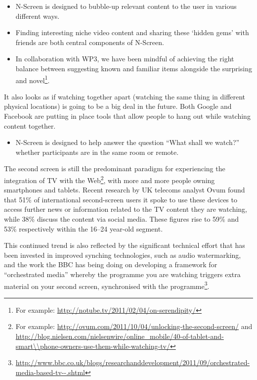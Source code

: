 \documentclass{notube}
\begin{document}
\begin{itemize}
\item{N-Screen is designed to bubble-up relevant content to the user in various different ways.}
\item{Finding interesting niche video content and sharing these `hidden gems’ with friends are both central components of N-Screen.}
\item{In collaboration with WP3, we have been mindful of achieving the right balance between suggesting known and familiar items alongside the surprising and novel\footnote{For example: \url{http://notube.tv/2011/02/04/on-serendipity/}}.}
\end{itemize}

It also looks as if watching together apart (watching the same thing in different physical locations) is going to be a big deal in the future. Both Google and Facebook are putting in place tools that allow people to hang out while watching content together.

\begin{itemize}
\item{N-Screen is designed to help answer the question ``What shall we watch?” whether participants are in the same room or remote.}
\end{itemize}

The second screen is still the predominant paradigm for experiencing the integration of TV with the Web\footnote{For example: \url{http://ovum.com/2011/10/04/unlocking-the-second-screen/} and \url{http://blog.nielsen.com/nielsenwire/online_mobile/40-of-tablet-and-smart\\phone-owners-use-them-while-watching-tv/}}, with more and more people owning smartphones and tablets. Recent research by UK telecoms analyst Ovum found that 51\% of international second-screen users it spoke to use these devices to access further news or information related to the TV content they are watching, while 38\% discuss the content via social media. These figures rise to 59\% and 53\% respectively within the 16–24 year-old segment.

This continued trend is also reflected by the significant technical effort that has been invested in improved synching technologies, such as audio watermarking, and the work the BBC has being doing on developing a framework for ``orchestrated media” whereby the programme you are watching triggers extra material on your second screen, synchronised with the programme\footnote{\url{http://www.bbc.co.uk/blogs/researchanddevelopment/2011/09/orchestrated-media-based-tv--.shtml}}. 
\end{document}
